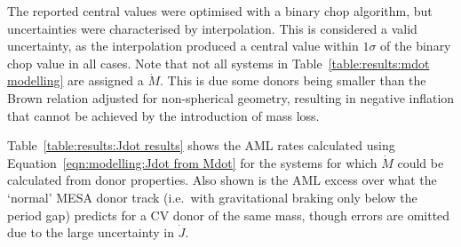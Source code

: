 The reported central values were optimised with a binary chop algorithm, but uncertainties were characterised by interpolation. This is considered a valid uncertainty, as the interpolation produced a central value within $1\sigma$ of the binary chop value in all cases.
Note that not all systems in Table~\ref{table:results:mdot modelling} are assigned a $\dot M$.
This is due some donors being smaller than the Brown relation adjusted for non-spherical geometry, resulting in negative inflation that cannot be achieved by the introduction of mass loss.

Table~\ref{table:results:Jdot results} shows the AML rates calculated using Equation~\ref{eqn:modelling:Jdot from Mdot} for the systems for which $\dot M$ could be calculated from donor properties. Also shown is the AML excess over what the `normal' MESA donor track (i.e.\ with gravitational braking only below the period gap) predicts for a CV donor of the same mass, though errors are omitted due to the large uncertainty in $\dot J$.

